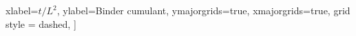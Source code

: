 		xlabel=$t/L^2$,
		ylabel={Binder cumulant},
		ymajorgrids=true,
		xmajorgrids=true,
		grid style = dashed,
		]

